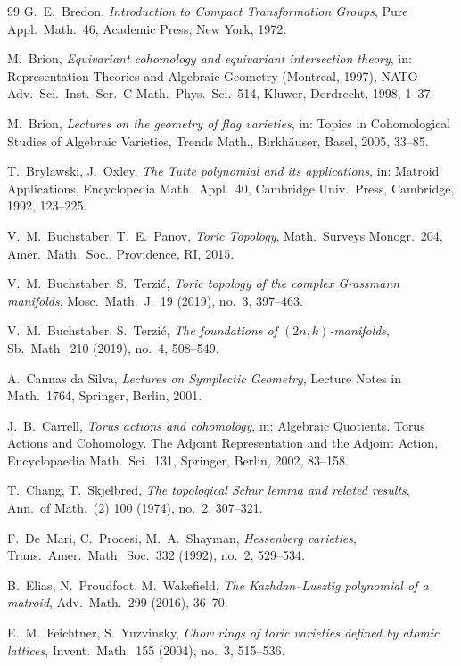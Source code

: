 \documentclass[11pt,a4paper]{article}
\numberwithin{equation}{section}
\theoremstyle{plain}
\theoremstyle{definition}
\theoremstyle{remark}
\begin{document}
\begin{thebibliography}{99}
 G.~E.~Bredon, \emph{Introduction to Compact Transformation Groups}, Pure Appl.\ Math.\ 46, Academic Press, New York, 1972.

 M.~Brion, \emph{Equivariant cohomology and equivariant intersection theory}, in: Representation Theories and Algebraic Geometry (Montreal, 1997), NATO Adv.\ Sci.\ Inst.\ Ser.\ C Math.\ Phys.\ Sci.\ 514, Kluwer, Dordrecht, 1998, 1--37.

 M.~Brion, \emph{Lectures on the geometry of flag varieties}, in: Topics in Cohomological Studies of Algebraic Varieties, Trends Math., Birkhäuser, Basel, 2005, 33--85.

 T.~Brylawski, J.~Oxley, \emph{The Tutte polynomial and its applications}, in: Matroid Applications, Encyclopedia Math.\ Appl.\ 40, Cambridge Univ.\ Press, Cambridge, 1992, 123--225.

 V.~M.~Buchstaber, T.~E.~Panov, \emph{Toric Topology}, Math.\ Surveys Monogr.\ 204, Amer.\ Math.\ Soc., Providence, RI, 2015.

 V.~M.~Buchstaber, S.~Terzić, \emph{Toric topology of the complex Grassmann manifolds}, Mosc.\ Math.\ J.\ 19 (2019), no.~3, 397--463.

 V.~M.~Buchstaber, S.~Terzić, \emph{The foundations of $(2n,k)$-manifolds}, Sb.\ Math.\ 210 (2019), no.~4, 508--549.

 A.~Cannas da Silva, \emph{Lectures on Symplectic Geometry}, Lecture Notes in Math.\ 1764, Springer, Berlin, 2001.

 J.~B.~Carrell, \emph{Torus actions and cohomology}, in: Algebraic Quotients. Torus Actions and Cohomology. The Adjoint Representation and the Adjoint Action, Encyclopaedia Math.\ Sci.\ 131, Springer, Berlin, 2002, 83--158.

 T.~Chang, T.~Skjelbred, \emph{The topological Schur lemma and related results}, Ann.\ of Math.\ (2) 100 (1974), no.~2, 307--321.

 F.~De~Mari, C.~Procesi, M.~A.~Shayman, \emph{Hessenberg varieties}, Trans.\ Amer.\ Math.\ Soc.\ 332 (1992), no.~2, 529--534.

 B.~Elias, N.~Proudfoot, M.~Wakefield, \emph{The Kazhdan--Lusztig polynomial of a matroid}, Adv.\ Math.\ 299 (2016), 36--70.

 E.~M.~Feichtner, S.~Yuzvinsky, \emph{Chow rings of toric varieties defined by atomic lattices}, Invent.\ Math.\ 155 (2004), no.~3, 515--536.


\end{thebibliography}
\end{document}
